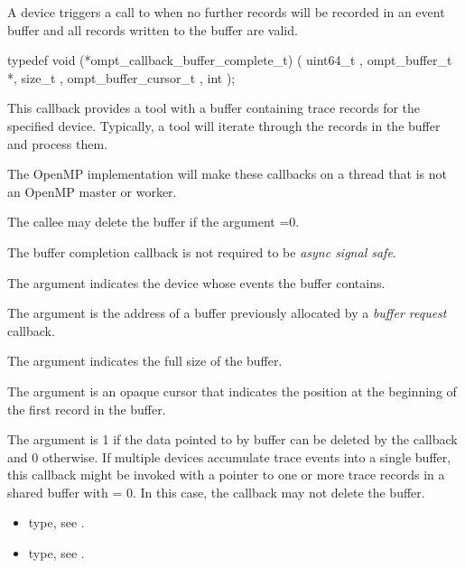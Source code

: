 \begin{itemize}
\begin{itemize}
\label{sec:ompt_callback_buffer_complete_t}
\summary
A device triggers a call to  when no further records will be recorded in an event buffer and all records written to the buffer are valid.

\format

\begin{ccppspecific}
\begin{omptCallback}
typedef void (*ompt_callback_buffer_complete_t) (
  uint64_t ,
  ompt_buffer_t *,
  size_t ,
  ompt_buffer_cursor_t ,
  int 
);
\end{omptCallback}
\end{ccppspecific}


\descr
This callback provides a tool with a buffer containing trace records for the
specified device. Typically, a tool will iterate through the records
in the buffer and process them.

The OpenMP implementation will make these callbacks
on a thread that is not an OpenMP master or worker.

The callee may delete the buffer if the argument
=0.

The buffer completion callback is not
required to be \emph{async signal safe}.

\argdesc

The argument  indicates the device whose events
the buffer contains.

The argument  is the address of a buffer previously
allocated by a \emph{buffer request} callback.

The argument  indicates the full size of the buffer.

The argument  is an opaque cursor that indicates the
position at the beginning of the first record in the buffer.

The argument  is 1 if the data pointed to by
buffer can be deleted by the callback and 0 otherwise. If multiple
devices accumulate trace events into a single buffer, this callback
might be invoked with a pointer to one or more trace records in a
shared buffer with  = 0. In this case, the callback
may not delete the buffer.

\crossreferences
\begin{itemize}
\item {} type, see
.
\item {} type, see
.
\end{itemize}


\end{itemize}
\end{itemize}
